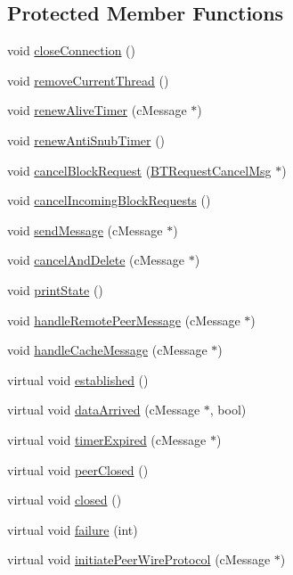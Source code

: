 \subsection*{Protected Member Functions}
\begin{DoxyCompactItemize}
\item 
void \hyperlink{classBTPeerWireClientHandlerBase_a64bb0a6c6a300c49219c3b76e48cfeb3}{close\+Connection} ()
\item 
void \hyperlink{classBTPeerWireClientHandlerBase_a1554aa617935544f997fcafbd27f7042}{remove\+Current\+Thread} ()
\item 
void \hyperlink{classBTPeerWireClientHandlerBase_ad8d40ee69f8d37e525ffd7e046192a8a}{renew\+Alive\+Timer} (c\+Message $\ast$)
\item 
void \hyperlink{classBTPeerWireClientHandlerBase_a940cd9fe9eaeefac82a1ba40f260f87f}{renew\+Anti\+Snub\+Timer} ()
\item 
void \hyperlink{classBTPeerWireClientHandlerBase_a82e3be625984c86701e0ac15f129cb20}{cancel\+Block\+Request} (\hyperlink{classBTRequestCancelMsg}{B\+T\+Request\+Cancel\+Msg} $\ast$)
\item 
void \hyperlink{classBTPeerWireClientHandlerBase_afd4e172043bf70460281d18c13b04a94}{cancel\+Incoming\+Block\+Requests} ()
\item 
void \hyperlink{classBTPeerWireClientHandlerBase_afee4cdc1b8788aeb4fc8004475c21344}{send\+Message} (c\+Message $\ast$)
\item 
void \hyperlink{classBTPeerWireClientHandlerBase_a8edba6c080d26e7b0b6b24000d145883}{cancel\+And\+Delete} (c\+Message $\ast$)
\item 
void \hyperlink{classBTPeerWireClientHandlerBase_ac7cd85f3e43b56f0c297421f11fc6457}{print\+State} ()
\item 
void \hyperlink{classBTPeerWireClientHandlerBase_ad30ffd6cdf219b2b85da3e76e914887d}{handle\+Remote\+Peer\+Message} (c\+Message $\ast$)
\item 
void \hyperlink{classBTPeerWireClientHandlerBase_a4aa8a43a2cea4f7fadf01f0fc1765129}{handle\+Cache\+Message} (c\+Message $\ast$)
\item 
virtual void \hyperlink{classBTPeerWireClientHandlerBase_a78616d6f856688d45cd1e3ea737ac904}{established} ()
\item 
virtual void \hyperlink{classBTPeerWireClientHandlerBase_a0a900fcb7639dab49a18b2a8f35fa0ef}{data\+Arrived} (c\+Message $\ast$, bool)
\item 
virtual void \hyperlink{classBTPeerWireClientHandlerBase_ad78ba790b8cd206d2ada2399f522cea3}{timer\+Expired} (c\+Message $\ast$)
\item 
virtual void \hyperlink{classBTPeerWireClientHandlerBase_a6895a4cacd6dd906c3c3e82cc085ecee}{peer\+Closed} ()
\item 
virtual void \hyperlink{classBTPeerWireClientHandlerBase_a6d9f301342ed5e5d769f4acdc190ff67}{closed} ()
\item 
virtual void \hyperlink{classBTPeerWireClientHandlerBase_a750903f6a338b89671f4aed9b7b8b006}{failure} (int)
\item 
virtual void \hyperlink{classBTPeerWireClientHandlerBase_ae1f3ba905dda5fd9fe9737a7a9196388}{initiate\+Peer\+Wire\+Protocol} (c\+Message $\ast$)
\end{DoxyCompactItemize}
